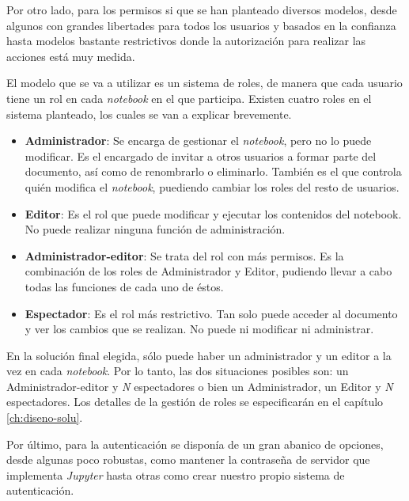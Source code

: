 \documentclass[11pt,spanish,listoffigures]{tfgetsinf}
\begin{document}
Por otro lado, para los permisos si que se han planteado diversos modelos, desde algunos con grandes libertades para todos los usuarios y basados en la confianza hasta modelos bastante restrictivos donde la autorización para realizar las acciones está muy medida.

El modelo que se va a utilizar es un sistema de roles, de manera que cada usuario tiene un rol en cada \textit{notebook} en el que participa. Existen cuatro roles en el sistema planteado, los cuales se van a explicar brevemente.

\begin{itemize}

\item \textbf{Administrador}: Se encarga de gestionar el \textit{notebook}, pero no lo puede modificar. Es el encargado de invitar a otros usuarios a formar parte del documento, así como de renombrarlo o eliminarlo. También es el que controla quién modifica el \textit{notebook}, puediendo cambiar los roles del resto de usuarios. 

\item \textbf{Editor}: Es el rol que puede modificar y ejecutar los contenidos del notebook. No puede realizar ninguna función de administración.

\item \textbf{Administrador-editor}: Se trata del rol con más permisos. Es la combinación de los roles de Administrador y Editor, pudiendo llevar a cabo todas las funciones de cada uno de éstos.

\item \textbf{Espectador}: Es el rol más restrictivo. Tan solo puede acceder al documento y ver los cambios que se realizan. No puede ni modificar ni administrar.

\end{itemize}

En la solución final elegida, sólo puede haber un administrador y un editor a la vez en cada \textit{notebook}. Por lo tanto, las dos situaciones posibles son: un Administrador-editor y \textit{N} espectadores o bien un Administrador, un Editor y \textit{N} espectadores. Los detalles de la gestión de roles se especificarán en el capítulo \ref{ch:diseno-solu}.

Por último, para la autenticación se disponía de un gran abanico de opciones, desde algunas poco robustas, como mantener la contraseña de servidor que implementa \textit{Jupyter} hasta otras como crear nuestro propio sistema de autenticación.
\end{document}
